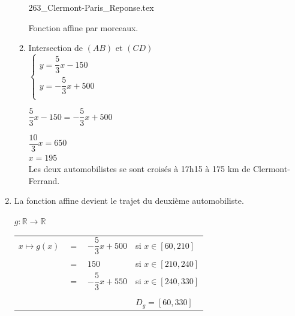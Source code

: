 \begin{enumerate}
\begin{enumerate}
\centerline{ {263_Clermont-Paris_Reponse.tex}}

\bigskip 

        Fonction affine par morceaux. \\
   \item Intersection de $(AB)$ et $(CD)$  \\
   
   $\begin{cases}
       y = \dfrac{5}{3} x -150 \\
       y = - \dfrac{5}{3} x +500 \\
    \end{cases} $ \\    
 
 \medskip 
    
   $  \dfrac{5}{3} x -150 = - \dfrac{5}{3} x +500 $ \\

\smallskip 
   
   $ \dfrac{10}{3} x = 650 $ \\

   $ x = 195 $ \\
    
   Les deux automobilistes se sont croisés à 17h15 à 175 km de Clermont-Ferrand.  
\end{enumerate}

\item La fonction affine devient le trajet du deuxième automobiliste. 

$g : \mathbb{R} \longrightarrow  \mathbb{R}$ \\
\begin{tabular}{l@{$\;$}c@{$\;$}l@{$\qquad$}l}
$x\longmapsto g(x) $ & $=$ & $ - \dfrac{5}{3} x + 500$ & si $ x \in [ 60, 210 ] $ \\
                     & $=$ & $ 150 $                   & si $ x \in [210, 240 ]  $ \\
                     & $=$ & $ - \dfrac{5}{3} x + 550$ & si $ x \in [240,330 ]  $ \\
                     &     &                           &   \\
                     &     &                           &   $D_g = [60, 330] $ \\
\end{tabular}

\end{enumerate}

\newpage 

